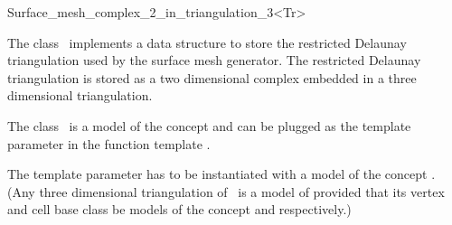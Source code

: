 

\begin{ccRefClass}{Surface_mesh_complex_2_in_triangulation_3<Tr>}  %


\ccDefinition
  
The class \ccRefName\  implements a data structure to store
the restricted Delaunay triangulation used by the surface mesh generator.
The restricted Delaunay triangulation is stored as a two dimensional
complex embedded in a three dimensional triangulation.


The class  \ccRefName\ is a model of the concept 
and can be plugged as the template parameter 
in the function template .


The template parameter  has to be instantiated
with a model of the concept .
(Any three dimensional   triangulation of
\cgal\ is a model of 
provided that its vertex and cell base class be models
of the concept  and
respectively.)





\ccIsModel











\end{ccRefClass}
